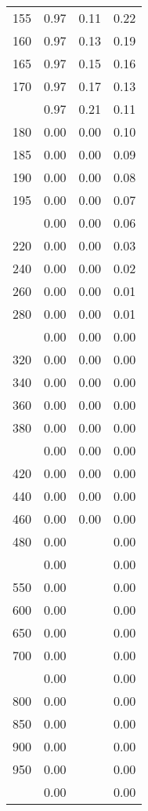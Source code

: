 \begin{table}[ht]
\begin{tabular}{lccc}
  155 & 0.97 & 0.11 & 0.22 \\ 
  160 & 0.97 & 0.13 & 0.19 \\ 
  165 & 0.97 & 0.15 & 0.16 \\ 
  170 & 0.97 & 0.17 & 0.13 \\ 
   \addlinespace
175 & 0.97 & 0.21 & 0.11 \\ 
  180 & 0.00 & 0.00 & 0.10 \\ 
  185 & 0.00 & 0.00 & 0.09 \\ 
  190 & 0.00 & 0.00 & 0.08 \\ 
  195 & 0.00 & 0.00 & 0.07 \\ 
   \addlinespace
200 & 0.00 & 0.00 & 0.06 \\ 
  220 & 0.00 & 0.00 & 0.03 \\ 
  240 & 0.00 & 0.00 & 0.02 \\ 
  260 & 0.00 & 0.00 & 0.01 \\ 
  280 & 0.00 & 0.00 & 0.01 \\ 
   \addlinespace
300 & 0.00 & 0.00 & 0.00 \\ 
  320 & 0.00 & 0.00 & 0.00 \\ 
  340 & 0.00 & 0.00 & 0.00 \\ 
  360 & 0.00 & 0.00 & 0.00 \\ 
  380 & 0.00 & 0.00 & 0.00 \\ 
   \addlinespace
400 & 0.00 & 0.00 & 0.00 \\ 
  420 & 0.00 & 0.00 & 0.00 \\ 
  440 & 0.00 & 0.00 & 0.00 \\ 
  460 & 0.00 & 0.00 & 0.00 \\ 
  480 & 0.00 &  & 0.00 \\ 
   \addlinespace
500 & 0.00 &  & 0.00 \\ 
  550 & 0.00 &  & 0.00 \\ 
  600 & 0.00 &  & 0.00 \\ 
  650 & 0.00 &  & 0.00 \\ 
  700 & 0.00 &  & 0.00 \\ 
   \addlinespace
750 & 0.00 &  & 0.00 \\ 
  800 & 0.00 &  & 0.00 \\ 
  850 & 0.00 &  & 0.00 \\ 
  900 & 0.00 &  & 0.00 \\ 
  950 & 0.00 &  & 0.00 \\ 
   \addlinespace
1000 & 0.00 &  & 0.00 \\ 
   \bottomrule
\end{tabular}
\end{table}
